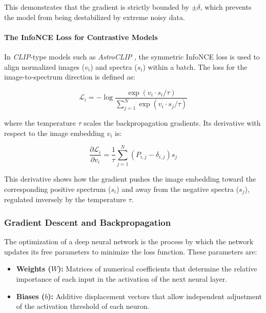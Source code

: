 This demonstrates that the gradient is strictly bounded by $\pm\delta$, which prevents the model from being destabilized by extreme noisy data.

\paragraph{The InfoNCE Loss for Contrastive Models}
In \textit{\gls{CLIP}}-type models such as \textit{AstroCLIP} \autocite{ar:astroclip}, the symmetric InfoNCE loss is used to align normalized images ($v_i$) and spectra ($s_i$) within a batch. The loss for the image-to-spectrum direction is defined as:

\begin{equation}
\mathcal{L}_{i} = -\log \dfrac{\exp\left(v_i \cdot s_i / \tau\right)}{\sum_{j=1}^{N} \exp\left(v_i \cdot s_j / \tau\right)}
\label{eq:infonce_loss}
\end{equation}

where the temperature $\tau$ scales the backpropagation gradients. Its derivative with respect to the image embedding $v_i$ is:

\begin{equation}
\dfrac{\partial \mathcal{L}_i}{\partial v_i} = \dfrac{1}{\tau} \sum_{j=1}^{N} \left(P_{i,j} - \delta_{i,j}\right) s_j
\label{eq:infonce_derivative}
\end{equation}

This derivative shows how the gradient pushes the image embedding toward the corresponding positive spectrum ($s_i$) and away from the negative spectra ($s_j$), regulated inversely by the temperature $\tau$.

\subsubsection{Gradient Descent and Backpropagation}

The optimization of a deep neural network is the process by which the network updates its free parameters to minimize the loss function. These parameters are:
\begin{itemize}
\item \textbf{Weights ($W$):} Matrices of numerical coefficients that determine the relative importance of each input in the activation of the next neural layer.
\item \textbf{Biases ($b$):} Additive displacement vectors that allow independent adjustment of the activation threshold of each neuron.
\end{itemize}

